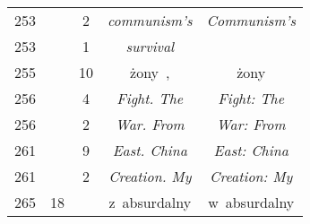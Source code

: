 \documentclass[a4paper,11pt]{article}
\begin{document}
\begin{center}
\begin{tabular}{|c|c|c|c|c|}
    253 & &  2 & \textit{communism's} & \textit{Communism's} \\
    253 & &  1 & \textit{survival} & \\
    255 & & 10 & żony~, & żony \\
    256 & &  4 & \textit{Fight. The} & \textit{Fight: The} \\
    256 & &  2 & \textit{War. From} & \textit{War: From} \\
    261 & &  9 & \textit{East. China} & \textit{East: China} \\
    261 & &  2 & \textit{Creation. My} & \textit{Creation: My} \\
    265 & 18 & & z~absurdalny & w~absurdalny \\
    \hline
  \end{tabular}

\end{center}

\vspace{\spaceTwo}

















\end{document}
